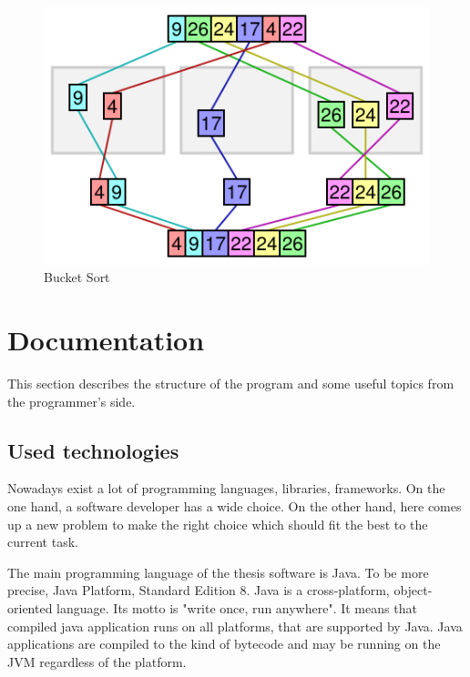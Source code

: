 \documentclass[
  field=inf,
  biblatex,
  language=english,
  glossaries,
  theorems=false,
  index
]{kidiplom}
\begin{document}
\begin{figure}[H]
\begin{center}
	
	\includegraphics[scale=0.5]{img/Bucketsort.png}
	\caption{Bucket Sort}\label{fig:radixsort}
\end{center}
\end{figure}

\newpage
\section{Documentation}

This section describes the structure of the program and some useful topics from the programmer's side. 

\subsection{Used technologies}

Nowadays exist a lot of programming languages, libraries, frameworks. On the one hand, a software developer has a wide choice. On the other hand, here comes up a new problem to make the right choice which should fit the best to the current task.

The main programming language of the thesis software is Java. To be more precise, Java Platform, Standard Edition 8. Java is a cross-platform, object-oriented language. Its motto is "write once, run anywhere". It means that compiled java application runs on all platforms, that are supported by Java. Java applications are compiled to the kind of bytecode and may be running on the \Gls{JVM} regardless of the platform. 
\end{document}
